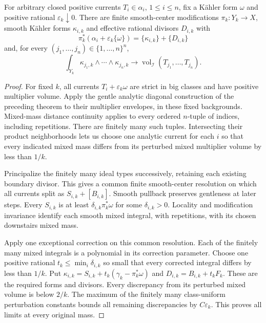\begin{theorem}\label{thm:mixed-fujita-boundary-approximation}
For arbitrary closed positive currents $T_i\in\alpha_i$, $1\leq i\leq n$, fix a K\"ahler form $\omega$ and positive rational $\varepsilon_k\downarrow0$. There are finite smooth-center modifications $\pi_k:Y_k\to X$, smooth K\"ahler forms $\kappa_{i,k}$ and effective rational divisors $D_{i,k}$ with
\[
 \pi_k^*(\alpha_i+\varepsilon_k\{\omega\})
               =\{\kappa_{i,k}\}+\{D_{i,k}\}
\]
and, for every $(j_1,\ldots,j_n)\in\{1,\ldots,n\}^n$,
\[
 \int_{Y_k}\kappa_{j_1,k}\wedge\cdots\wedge\kappa_{j_n,k}
                     \longrightarrow\operatorname{vol}_{\mathcal I}(T_{j_1},\ldots,T_{j_n}).
\]
\end{theorem}
\begin{proof}
For fixed $k$, all currents $T_i+\varepsilon_k\omega$ are strict in big classes and have positive multiplier volume. Apply the gentle analytic diagonal construction of the preceding theorem to their multiplier envelopes, in these fixed backgrounds. Mixed-mass distance continuity applies to every ordered $n$-tuple of indices, including repetitions. There are finitely many such tuples. Intersecting their product neighborhoods lets us choose one analytic current for each $i$ so that every indicated mixed mass differs from its perturbed mixed multiplier volume by less than $1/k$.

Principalize the finitely many ideal types successively, retaining each existing boundary divisor. This gives a common finite smooth-center resolution on which all currents split as $S_{i,k}+[B_{i,k}]$. Smooth pullback preserves gentleness at later steps. Every $S_{i,k}$ is at least $\delta_{i,k}\pi_k^*\omega$ for some $\delta_{i,k}>0$. Locality and modification invariance identify each smooth mixed integral, with repetitions, with its chosen downstairs mixed mass.

Apply one exceptional correction on this common resolution. Each of the finitely many mixed integrals is a polynomial in its correction parameter. Choose one positive rational $t_k\leq\min_i\delta_{i,k}$ so small that every corrected integral differs by less than $1/k$. Put $\kappa_{i,k}=S_{i,k}+t_k(\gamma_k-\pi_k^*\omega)$ and $D_{i,k}=B_{i,k}+t_kF_k$. These are the required forms and divisors. Every discrepancy from its perturbed mixed volume is below $2/k$. The maximum of the finitely many class-uniform perturbation constants bounds all remaining discrepancies by $C\varepsilon_k$. This proves all limits at every original mass.
\end{proof}

